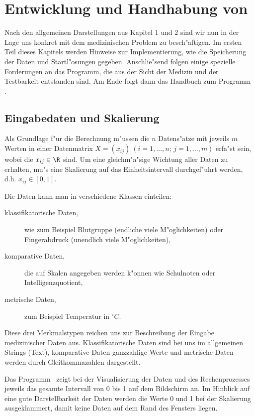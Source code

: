 \chapter{Entwicklung und Handhabung von \Clustering}
Nach den allgemeinen Darstellungen aus Kapitel 1 und 2 sind wir nun
in der Lage uns konkret mit dem medizinischen Problem zu
besch"aftigen. Im ersten Teil dieses Kapitels werden
Hinweise zur Implementierung, wie die Speicherung der Daten und 
Startl"osungen gegeben. Anschlie"send folgen 
einige spezielle Forderungen an das Programm, die aus der Sicht der
Medizin und der Testbarkeit entstanden sind.
Am Ende folgt dann das Handbuch zum Programm \Clustering.

\section{Eingabedaten und Skalierung}
Als Grundlage f"ur die Berechnung m"ussen die $n$ Datens"atze mit 
jeweils $m$ Werten in einer Datenmatrix $X=(x_{ij}) \  (i=1,\dots,n;
\,j=1,\dots,m)$ erfa"st sein, wobei die $x_{ij} \in \R$ sind.
Um eine gleichm"a"sige Wichtung aller Daten zu erhalten, mu"s eine
Skalierung auf das Einheitsintervall durchgef"uhrt werden, d.h.
$x_{ij} \in [0,1]$.

Die Daten kann man in verschiedene Klassen einteilen:
\begin{description}
\item[klassifikatorische Daten,] wie zum Beispiel Blutgruppe
	(endliche viele M"oglichkeiten) oder Fingerabdruck (unendlich
	viele M"og\-lich\-kei\-ten),
\item[komparative Daten,] die auf Skalen angegeben werden k"onnen 
	wie Schulnoten oder Intelligenzquotient,
\item[metrische Daten,] zum Beispiel Temperatur in $ ^\circ C$.
\end{description}
Diese drei Merkmalstypen reichen uns zur Beschreibung 
der Eingabe medizinischer Daten aus.
Klassifikatorische Daten sind bei uns im allgemeinen
Strings (Text), komparative Daten ganzzahlige Werte und metrische Daten
werden durch Gleitkommazahlen dargestellt.

Das Programm \Clustering\ zeigt bei der Visualisierung der Daten und des
Rechenprozesses jeweils das gesamte Intervall von 0 bis 1 auf dem
Bildschirm an. Im Hinblick auf eine gute Darstellbarkeit der Daten
werden die Werte 0 und 1 bei der Skalierung ausgeklammert, 
damit keine Daten auf dem Rand des Fensters liegen.

